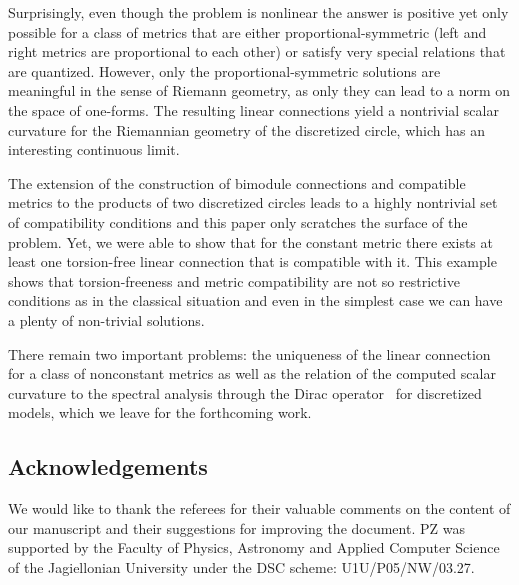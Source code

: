 \documentclass[pdftex]{sigma}
\numberwithin{equation}{section}
\begin{document}
Surprisingly, even though the problem is nonlinear the answer is positive yet only possible for a class of metrics that are either
proportional-symmetric (left and right metrics are proportional to each other) or satisfy very special relations that are quantized.
However, only the proportional-symmetric solutions are meaningful in the sense of Riemann geometry, as only they can lead
to a norm on the space of one-forms. The resulting linear connections yield a nontrivial scalar curvature for the Riemannian
geometry of the discretized circle, which has an interesting continuous limit.

The extension of the construction of bimodule connections and compatible metrics to the products
of two discretized circles leads to a highly nontrivial set of compatibility conditions and this paper
only scratches the surface of the problem. Yet, we were able to show that for the constant metric
there exists at least one torsion-free linear connection that is compatible with it. This example shows that torsion-freeness and
metric compatibility are not so restrictive conditions as in the classical situation and even in the simplest case we can have
a plenty of non-trivial solutions.

There remain two important problems: the uniqueness of the linear connection for a class of
nonconstant metrics as well as the relation of the computed scalar curvature to the spectral
analysis through the Dirac operator~\cite{Ba15,BG19,Gl17} for discretized models, which we leave
for the forthcoming work.

\subsection*{Acknowledgements}
We would like to thank the referees for their valuable comments on the content of our manuscript and their suggestions for improving the document. PZ was supported by the Faculty of Physics, Astronomy and Applied Computer Science of the Jagiellonian University under the DSC scheme: U1U/P05/NW/03.27.
\end{document}
